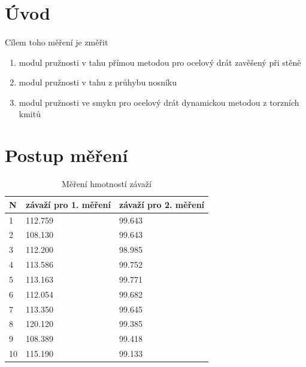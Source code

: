 \documentclass[a4paper,11pt]{article}
\begin{document}
\section{Úvod}

    \paragraph{} Cílem toho měření je změřit
    
    \begin{enumerate}
        \item modul pružnosti v tahu přímou metodou pro ocelový drát zavěšený při stěně
        \item modul pružnosti v tahu z průhybu nosníku
        \item modul pružnosti ve smyku pro ocelový drát dynamickou metodou z torzních kmitů
    \end{enumerate}

\section{Postup měření}

        \begin{table}[h]
            \centering
            \begin{tabular}{ | l || l | l | }
                \hline
                    N & závaží pro 1. měření & závaží pro 2. měření \\ \hline
                    1 & 112.759 & 99.643 \\ \hline
                    2 & 108.130 & 99.643 \\ \hline
                    3 & 112.200 & 98.985 \\ \hline
                    4 & 113.586 & 99.752 \\ \hline
                    5 & 113.163 & 99.771 \\ \hline
                    6 & 112.054 & 99.682 \\ \hline
                    7 & 113.350 & 99.645 \\ \hline
                    8 & 120.120 & 99.385 \\ \hline
                    9 & 108.389 & 99.418 \\ \hline
                    10 & 115.190 & 99.133 \\
                \hline
            \end{tabular}
            \caption{Měření hmotností závaží}
            \label{fig:hmotnosti}
        \end{table}
\end{document}
